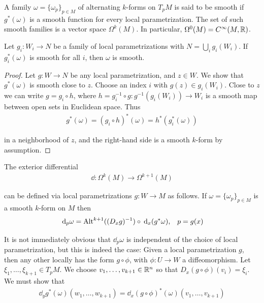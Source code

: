 \begin{definition}\label{definition:9-5}
  A family $\omega = \{\omega_p\}_{p\in M}$ of alternating $k$-forms on $T_pM$ is said
to be smooth if $g^*(\omega)$ is a smooth function for every local parametrization. The
set of such smooth families is a vector space $\Omega^k(M)$. In particular, $\Omega^0(M)
= C^\infty(M, {\mathbb{R}})$.
\end{definition}

\begin{lemma}\label{lemma:9-6}
  Let $g_i:W_i\to N$ be a family of local parametrizations with $N=\bigcup_i g_i(W_i)$. If $g_i^*(\omega)$ is smooth for all $i$, then $\omega$ is smooth.
\end{lemma}

\begin{proof}
  Let $g:W\to N$ be any local parametrization, and $z\in W$. We show that
$g^*(\omega)$ is smooth close to $z$. Choose an index $i$ with $g(z)\in g_i(W_i)$. 
Close to $z$ we can write $g=g_i\circ h$, where $h=g_i^{-1}\circ g:g^{-1}(g_i(W_i))\to 
W_i$ is a smooth map between open sets in Euclidean space. Thus 
\begin{align*}
  g^*(\omega) = (g_i\circ h)^*(\omega) = h^*(g_i^*(\omega))
\end{align*}

in a neighborhood of $z$, and the right-hand side is a smooth $k$-form by assumption.
\end{proof}

The exterior differential 
\begin{align*}
  \dd:\Omega^k(M) \to\Omega^{k+1}(M)
\end{align*}

can be defined via local parametrizations $g:W\to M$ as follows. If $\omega=\{\omega_p\}_{p\in M}$
is a smooth $k$-form on $M$ then
\begin{align}
  \dd_p\omega = \alt^{k+1}((D_xg)^{-1})\circ \dd_x(g^*\omega), 
  && p = g(x)
\end{align}

It is not immediately obvious that $\dd_p\omega$ is independent of the choice of local
parametrization, but this is indeed the case: Given a local parametrization $g$, then
any other locally has the form $g\circ\phi$, with $\phi:U\to W$ a diffeomorphism. Let
$\xi_1, \ldots, \xi_{k+1}\in T_pM$. We choose $v_1, \ldots, v_{k+1}\in{\ensuremath{\mathbb{R}}}^n$ so that 
$D_x(g\circ \phi)(v_i) = \xi_i$. We must show that
\begin{align*}
  \dd_yg^*(\omega)(w_1, \ldots, w_{k+1})
  = \dd_x(g\circ \phi)^*(\omega)(v_1, \ldots, v_{k+1})
\end{align*}

